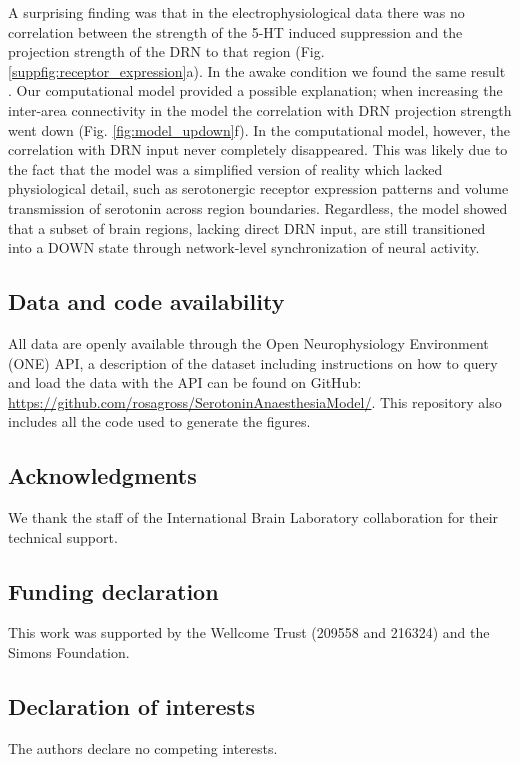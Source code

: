 \documentclass[11pt,a4paper,onecolumn]{article}
\begin{document}
A surprising finding was that in the electrophysiological data there was no correlation between the strength of the 5-HT induced suppression and the projection strength of the DRN to that region (Fig. \ref{suppfig:receptor_expression}a). In the awake condition we found the same result \citep{meijerSerotoninDrivesChoiceindependent2025}. Our computational model provided a possible explanation; when increasing the inter-area connectivity in the model the correlation with DRN projection strength went down (Fig. \ref{fig:model_updown}f). In the computational model, however, the correlation with DRN input never completely disappeared. This was likely due to the fact that the model was a simplified version of reality which lacked physiological detail, such as serotonergic receptor expression patterns and volume transmission of serotonin across region boundaries. Regardless, the model showed that a subset of brain regions, lacking direct DRN input, are still transitioned into a DOWN state through network-level synchronization of neural activity. 

\subsection*{Data and code availability}
All data are openly available through the Open Neurophysiology Environment (ONE) API, a description of the dataset including instructions on how to query and load the data with the API can be found on GitHub: \url{https://github.com/rosagross/SerotoninAnaesthesiaModel/}. This repository also includes all the code used to generate the figures.

\subsection*{Acknowledgments}
We thank the staff of the International Brain Laboratory collaboration for their technical support.

\subsection*{Funding declaration}
This work was supported by the Wellcome Trust (209558 and 216324) and the Simons Foundation.

\subsection*{Declaration of interests}
The authors declare no competing interests.
\end{document}
